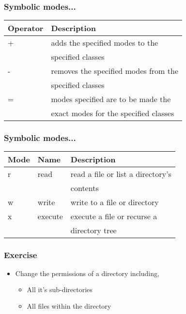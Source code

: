 \documentclass[17pt,compress]{beamer}
\begin{document}
\begin{frame}[fragile]
  \frametitle{Symbolic modes...}
  \begin{small}
    \begin{center}
      \begin{tabular}{ll}
        Operator  &  Description                                                                   \\
        \hline
         +         &  adds the specified modes to the               \\
                  &  specified classes                             \\
         -         &  removes the specified modes from the          \\
                  &  specified classes                             \\
         =         &  modes specified are to be made the            \\
                  &  exact modes for the specified classes  
      \end{tabular}
    \end{center}
   \end{small}
\end{frame}

\begin{frame}
  \frametitle{Symbolic modes...}
   \begin{small}
    \begin{center}
      \begin{tabular}{lll}
        Mode  &  Name     &  Description                                 \\
        \hline
        r     &  read     &  read a file or list a directory's   \\
              &           &  contents \\
        w     &  write    &  write to a file or directory                \\\vspace{2pt}
        x     &  execute  &  execute a file or recurse a   \\
              &           &  directory tree
      \end{tabular}
    \end{center}
  \end{small}
\end{frame}


\begin{frame}
  \frametitle{Exercise}
  \begin{itemize}
  \item Change the permissions of a directory including,
  \begin{itemize}
  \item All it's sub-directories
  \item All files within the directory
  \end{itemize} 
  \end{itemize}
\end{frame}
\end{document}
